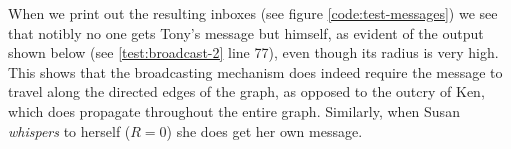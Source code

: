 
When we print out the resulting inboxes (see figure \ref{code:test-messages})
we see that notibly no one gets Tony's message but himself, as evident of the
output shown below (see \ref{test:broadcast-2} line 77), even though its
radius is very high. This shows that the broadcasting mechanism does indeed
require the message to travel along the directed edges of the graph, as
opposed to the outcry of Ken, which does propagate throughout the entire
graph. Similarly, when Susan {\it whispers} to herself ($R=0$) she does get
her own message.


